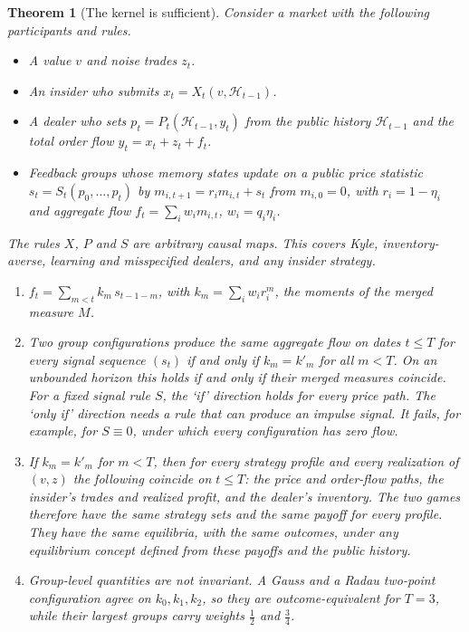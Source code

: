 \documentclass[12pt]{article}
\newtheorem{theorem}{Theorem}[section]
\theoremstyle{definition}
\theoremstyle{remark}
\begin{document}
\begin{theorem}[The kernel is sufficient]\label{thm:eqinv}
Consider a market with the following participants and rules.
\begin{itemize}[itemsep=1pt,topsep=2pt]
\item A value $v$ and noise trades $z_t$.
\item An insider who submits $x_t=X_t(v,\mathcal H_{t-1})$.
\item A dealer who sets $p_t=P_t(\mathcal H_{t-1},y_t)$ from the public history $\mathcal H_{t-1}$ and the total order flow $y_t=x_t+z_t+f_t$.
\item Feedback groups whose memory states update on a public price statistic $s_t=S_t(p_0,\ldots,p_t)$ by $m_{i,t+1}=r_im_{i,t}+s_t$ from $m_{i,0}=0$, with $r_i=1-\eta_i$ and aggregate flow $f_t=\sum_iw_im_{i,t}$, $w_i=q_i\eta_i$.
\end{itemize}
The rules $X$, $P$ and $S$ are arbitrary causal maps. This covers Kyle, inventory-averse, learning and misspecified dealers, and any insider strategy.
\begin{enumerate}[label=(\roman*),itemsep=1pt]
\item $f_t=\sum_{m<t}k_m\,s_{t-1-m}$, with $k_m=\sum_iw_ir_i^m$, the moments of the merged measure $M$.
\item Two group configurations produce the same aggregate flow on dates $t\le T$ for every signal sequence $(s_t)$ if and only if $k_m=k'_m$ for all $m<T$. On an unbounded horizon this holds if and only if their merged measures coincide. For a fixed signal rule $S$, the `if' direction holds for every price path. The `only if' direction needs a rule that can produce an impulse signal. It fails, for example, for $S\equiv0$, under which every configuration has zero flow.
\item If $k_m=k'_m$ for $m<T$, then for every strategy profile and every realization of $(v,z)$ the following coincide on $t\le T$: the price and order-flow paths, the insider's trades and realized profit, and the dealer's inventory. The two games therefore have the same strategy sets and the same payoff for every profile. They have the same equilibria, with the same outcomes, under any equilibrium concept defined from these payoffs and the public history.
\item Group-level quantities are not invariant. A Gauss and a Radau two-point configuration agree on $k_0,k_1,k_2$, so they are outcome-equivalent for $T=3$, while their largest groups carry weights $\tfrac12$ and $\tfrac34$.
\end{enumerate}
\end{theorem}
\end{document}
